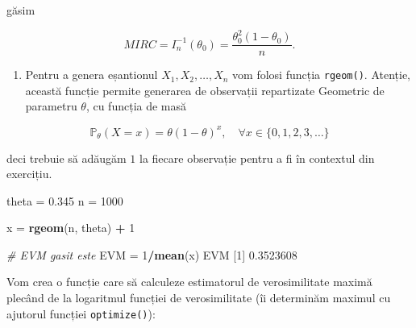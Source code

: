 \documentclass[]{article}
\newenvironment{Shaded}{\begin{snugshade}}{\end{snugshade}}
\newcommand{\KeywordTok}[1]{\textcolor[rgb]{0.13,0.29,0.53}{\textbf{#1}}}
\newcommand{\DecValTok}[1]{\textcolor[rgb]{0.00,0.00,0.81}{#1}}
\newcommand{\FloatTok}[1]{\textcolor[rgb]{0.00,0.00,0.81}{#1}}
\newcommand{\StringTok}[1]{\textcolor[rgb]{0.31,0.60,0.02}{#1}}
\newcommand{\CommentTok}[1]{\textcolor[rgb]{0.56,0.35,0.01}{\textit{#1}}}
\newcommand{\OperatorTok}[1]{\textcolor[rgb]{0.81,0.36,0.00}{\textbf{#1}}}
\newcommand{\NormalTok}[1]{#1}
\providecommand{\tightlist}{%
  \setlength{\itemsep}{0pt}\setlength{\parskip}{0pt}}
\begin{document}
găsim

\[
  MIRC = I_n^{-1}(\theta_0) = \frac{\theta_0^2(1-\theta_0)}{n}.
\]

\begin{enumerate}
\def\labelenumi{\alph{enumi})}
\setcounter{enumi}{6}
\tightlist
\item
  Pentru a genera eșantionul \(X_1, X_2, \ldots, X_n\) vom folosi
  funcția \texttt{rgeom()}. Atenție, această funcție permite generarea
  de observații repartizate Geometric de parametru \(\theta\), cu
  funcția de masă
\end{enumerate}

\[
 \mathbb{P}_{\theta}(X = x) = \theta (1-\theta)^{x}, \quad \forall x\in\{0,1,2,3,\ldots\}  
\]

deci trebuie să adăugăm \(1\) la fiecare observație pentru a fi în
contextul din exercițiu.

\begin{Shaded}
\begin{Highlighting}[]
\NormalTok{theta =}\StringTok{ }\FloatTok{0.345}
\NormalTok{n =}\StringTok{ }\DecValTok{1000}

\NormalTok{x =}\StringTok{ }\KeywordTok{rgeom}\NormalTok{(n, theta) }\OperatorTok{+}\StringTok{ }\DecValTok{1}

\CommentTok{# EVM gasit este }
\NormalTok{EVM =}\StringTok{ }\DecValTok{1}\OperatorTok{/}\KeywordTok{mean}\NormalTok{(x)}
\NormalTok{EVM}
\NormalTok{[}\DecValTok{1}\NormalTok{] }\FloatTok{0.3523608}
\end{Highlighting}
\end{Shaded}

Vom crea o funcție care să calculeze estimatorul de verosimilitate
maximă plecând de la logaritmul funcției de verosimilitate (îi
determinăm maximul cu ajutorul funcției \texttt{optimize()}):
\end{document}
